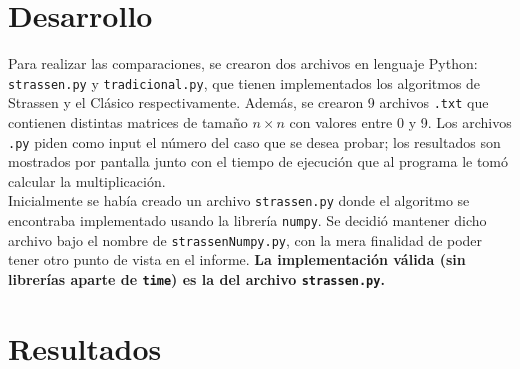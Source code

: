 \documentclass[a4paper,11pt]{article}
\begin{document}
\section{Desarrollo}
Para realizar las comparaciones, se crearon dos archivos en lenguaje Python: \texttt{strassen.py} y \texttt{tradicional.py}, que tienen implementados los algoritmos de Strassen y el Clásico respectivamente. Además, se crearon 9 archivos \texttt{.txt} que contienen distintas matrices de tamaño $n\times n$ con valores entre 0 y 9. Los archivos \texttt{.py} piden como input el número del caso que se desea probar; los resultados son mostrados por pantalla junto con el tiempo de ejecución que al programa le tomó calcular la multiplicación.\\

Inicialmente se había creado un archivo \texttt{strassen.py} donde el algoritmo se encontraba implementado usando la librería \texttt{numpy}. Se decidió mantener dicho archivo bajo el nombre de \texttt{strassenNumpy.py}, con la mera finalidad de poder tener otro punto de vista en el informe. \textbf{La implementación válida (sin librerías aparte de \texttt{time}) es la del archivo \texttt{strassen.py}.}

\section{Resultados}
\end{document}
